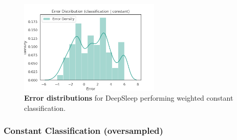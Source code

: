 \documentclass[11pt]{scrartcl}
\begin{document}
\begin{figure}[hbt]
	\centering
	\includegraphics[width=0.6\textwidth]{img/learning/original_gdansk_sleepnet_classification_constant_none_weighted_error_distribution.png}
	\caption{\textcolor{viridis5}{\textbf{Error distributions}} for DeepSleep performing weighted constant classification.}
	\label{fig:original_gdansk_sleepnet_classification_constant_none_weighted_error_distribution}
\end{figure}

\FloatBarrier



\FloatBarrier
\subsubsection{Constant Classification (oversampled)}
\end{document}
